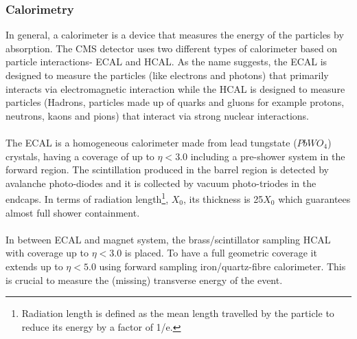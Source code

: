 
\subsubsection{Calorimetry} %
\label{ssub:calorimetry}
In general, a calorimeter is a device that measures the energy of the particles by absorption. The CMS detector uses two different types of calorimeter based on particle interactions- ECAL and HCAL. As the name suggests, the ECAL is designed to measure the particles (like electrons and photons) that primarily interacts via electromagnetic interaction while the HCAL is designed to measure particles (Hadrons, particles made up of quarks and gluons for example protons, neutrons, kaons and pions) that interact via strong nuclear interactions.\\\\
The ECAL is a homogeneous calorimeter made from lead tungstate ($PbWO_4$) crystals, having a coverage of up to $\eta < 3.0$ including a pre-shower system in the forward region. The scintillation produced in the barrel region is detected by avalanche photo-diodes and it is collected by vacuum photo-triodes in the endcaps. In terms of radiation length\footnote{Radiation length is defined as the mean length travelled by the particle to reduce its energy by a factor of 1/e.}, $X_0$, its thickness is 25$X_0$ which guarantees almost full shower containment.\\\\
In between ECAL and magnet system, the brass/scintillator sampling HCAL with coverage up to $\eta < 3.0$ is placed. To have a full geometric coverage it extends up to $\eta < 5.0$ using forward sampling iron/quartz-fibre calorimeter. This is crucial to measure the (missing) transverse energy of the event.



